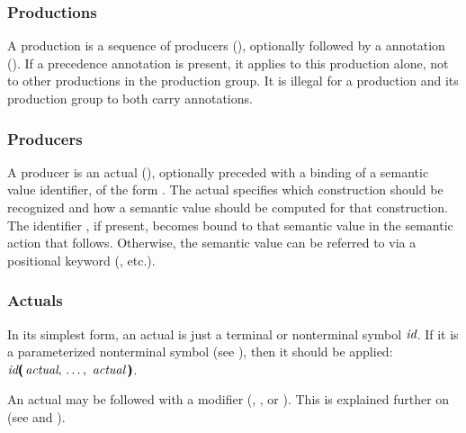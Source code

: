 \documentclass[onecolumn,11pt,nocopyrightspace,preprint]{sigplanconf}
\begin{document}
\subsubsection{Productions}
\label{sec:productions}

A production is a sequence of producers (), optionally
followed by a \dprec annotation (). If a precedence annotation
is present, it applies to this production alone, not to other productions in
the production group. It is illegal for a production and its production group
to both carry \dprec annotations.

\subsubsection{Producers}
\label{sec:producers}

A producer is an actual (), optionally preceded with a
binding of a semantic value identifier, of the form  \dequal. The
actual specifies which construction should be recognized and how a semantic
value should be computed for that construction. The identifier , if
present, becomes bound to that semantic value in the semantic action that
follows. Otherwise, the semantic value can be referred to via a positional
keyword (, etc.).

\subsubsection{Actuals}
\label{sec:actual}

In its simplest form, an actual is just a terminal or nonterminal symbol
$\textit{id}$. If it is a parameterized nonterminal symbol (see
), then it should be applied:
$\nt{id}\tuple{\nt{actual}}$.

An actual may be followed with a modifier (\dquestion, \dplus, or
\dstar). This is explained further on (see  and
).
\end{document}
